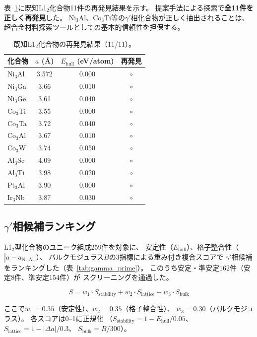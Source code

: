 \documentclass[5p,twocolumn]{elsarticle}
\begin{document}
表~\ref{tab:known_l12}に既知L1$_2$化合物11件の再発見結果を示す。
提案手法による探索で\textbf{全11件を正しく再発見}した。
Ni$_3$Al、Co$_3$Ti等の$\gamma'$相化合物が正しく抽出されることは、
超合金材料探索ツールとしての基本的信頼性を担保する。

\begin{table}[t]
  \centering
  \caption{既知L1$_2$化合物の再発見結果（11/11）。}
  \label{tab:known_l12}
  \small
  \begin{tabular}{lccc}
    \toprule
    化合物 & $a$ (\AA) & $E_\text{hull}$ (eV/atom) & 再発見 \\
    \midrule
    Ni$_3$Al & 3.572 & 0.000 & $\circ$ \\
    Ni$_3$Ga & 3.66 & 0.010 & $\circ$ \\
    Ni$_3$Ge & 3.61 & 0.040 & $\circ$ \\
    Co$_3$Ti & 3.55 & 0.000 & $\circ$ \\
    Co$_3$Ta & 3.72 & 0.040 & $\circ$ \\
    Co$_3$Al & 3.67 & 0.010 & $\circ$ \\
    Co$_3$W  & 3.74 & 0.050 & $\circ$ \\
    Al$_3$Sc & 4.09 & 0.000 & $\circ$ \\
    Al$_3$Ti & 3.98 & 0.020 & $\circ$ \\
    Pt$_3$Al & 3.90 & 0.000 & $\circ$ \\
    Ir$_3$Nb & 3.87 & 0.030 & $\circ$ \\
    \bottomrule
  \end{tabular}
\end{table}

\subsection{$\gamma'$相候補ランキング}
\label{sec:gamma_prime}

L1$_2$型化合物のユニーク組成259件を対象に、
安定性（$E_\text{hull}$）、格子整合性（$|a - a_{\text{Ni}_3\text{Al}}|$）、
バルクモジュラス$B$の3指標による重み付き複合スコアで
$\gamma'$相候補をランキングした（表~\ref{tab:gamma_prime}）。
このうち安定・準安定162件（安定8件、準安定154件）が
スクリーニングを通過した。

\begin{equation}
  S = w_1 \cdot S_\text{stability} + w_2 \cdot S_\text{lattice} + w_3 \cdot S_\text{bulk}
  \label{eq:composite_score}
\end{equation}

ここで$w_1 = 0.35$（安定性）、$w_2 = 0.35$（格子整合性）、
$w_3 = 0.30$（バルクモジュラス）。
各スコアは0--1に正規化
（$S_\text{stability} = 1 - E_\text{hull}/0.05$、
$S_\text{lattice} = 1 - |\Delta a|/0.3$、
$S_\text{bulk} = B/300$）。
\end{document}
